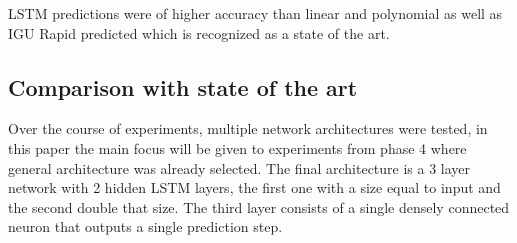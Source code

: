 \documentclass{article}
\begin{document}
LSTM predictions were of higher accuracy than linear and polynomial as well as IGU Rapid
predicted which is recognized as a state of the art.

\subsection{Comparison with state of the art}
Over the course of experiments, multiple network architectures were tested, in this paper
the main focus will be given to experiments from phase 4 where general architecture was already
selected.
The final architecture is a 3 layer network with 2 hidden LSTM layers, the first one with a size equal
to input and the second double that size. The third layer consists of a single densely connected neuron
that outputs a single prediction step.
\end{document}
